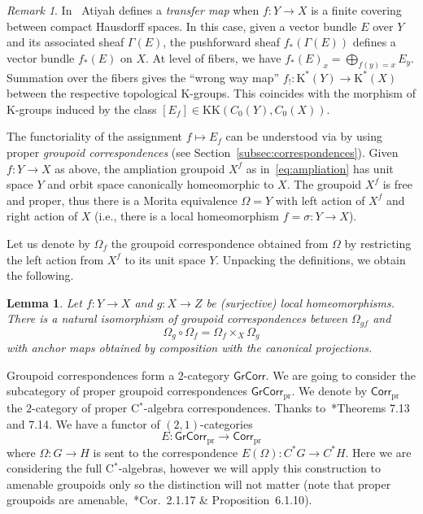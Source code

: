 \documentclass[a4paper,reqno]{amsart}
\theoremstyle{plain}
\newtheorem{lemma}[theorem]{Lemma}
\theoremstyle{definition}
\theoremstyle{remark}
\newtheorem{remark}[theorem]{Remark}
\numberwithin{equation}{section}
\newcommand{\rK}{\mathrm{K}}
\newcommand{\GrCorr}{\mathsf{GrCorr}}
\newcommand{\PrCorr}{\mathsf{Corr}_{\mathrm{pr}}}
\newcommand{\PrGrCorr}{\mathsf{GrCorr}_{\mathrm{pr}}}
\newcommand{\KK}{\mathrm{KK}}
\begin{document}
\begin{remark}%
In~\cite{ati:char} Atiyah defines a \emph{transfer map} when $f\colon Y\to X$ is a finite covering between compact Hausdorff spaces.
In this case, given a vector bundle $E$ over $Y$ and its associated sheaf $\Gamma(E)$, the pushforward sheaf $f_*(\Gamma(E))$ defines a vector bundle $f_*(E)$ on $X$.
At level of fibers, we have $f_*(E)_x = \bigoplus_{f(y)=x} E_y$.
Summation over the fibers gives the ``wrong way map'' $f_!\colon \rK^*(Y)\to \rK^*(X)$ between the respective topological $\rK$-groups.
This coincides with the morphism of $\rK$-groups induced by the class $[E_f]\in \KK(C_0(Y),C_0(X))$.
\end{remark}

The functoriality of the assignment $f\mapsto E_f$ can be understood via by using proper \emph{groupoid correspondences} (see Section~\ref{subsec:correspondences}).
Given $f\colon Y\to X$ as above, the ampliation groupoid $X^f$ as in~\eqref{eq:ampliation} has unit space $Y$ and orbit space canonically homeomorphic to $X$.
The groupoid $X^f$ is free and proper, thus there is a Morita equivalence $\Omega=Y$ with left action of $X^f$ and right action of $X$ (i.e., there is a local homeomorphism $f=\sigma\colon Y \to X$). 

Let us denote by $\Omega_f$ the groupoid correspondence obtained from $\Omega$ by restricting the left action from $X^f$ to its unit space $Y$.
Unpacking the definitions, we obtain the following.

\begin{lemma}\label{lem:grcorr-comp}
Let $f\colon Y\to X$ and $g\colon X\to Z$ be (surjective) local homeomorphisms. There is a natural isomorphism of groupoid correspondences between $\Omega_{gf}$ and 
\[
\Omega_g\circ \Omega_f= \Omega_f \times _X \Omega _g
\]
with anchor maps obtained by composition with the canonical projections.
\end{lemma}

Groupoid correspondences form a $2$-category $\GrCorr$. We are going to consider the subcategory of proper groupoid correspondences $\PrGrCorr$. We denote by $\PrCorr$ the $2$-category of proper C$^*$-algebra correspondences. Thanks to~\cite{akm:grcorr}*{Theorems 7.13 and 7.14}. We have a functor of $(2,1)$-categories 
\[
E\colon\PrGrCorr\to \PrCorr
\]
where $\Omega\colon G\to H$ is sent to the correspondence $E(\Omega)\colon C^*G\to C^*H$. Here we are considering the full C$^*$-algebras, however we will apply this construction to amenable groupoids only so the distinction will not matter (note that proper groupoids are amenable,~\cite{renroch:amgrp}*{Cor.~2.1.17 \& Proposition~6.1.10}).
\end{document}
